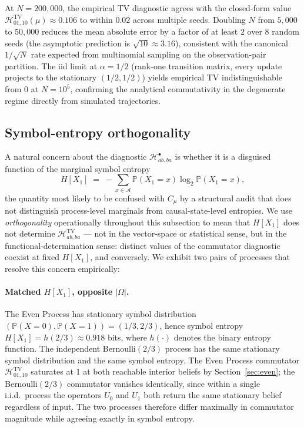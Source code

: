 \documentclass[11pt,a4paper]{article}
\theoremstyle{plain}
\theoremstyle{definition}
\theoremstyle{remark}
\newcommand{\Prob}{\mathbb{P}}
\newcommand{\Alphabet}{\mathcal{A}}
\begin{document}
At $N = 200{,}000$, the empirical TV diagnostic agrees with the closed-form value $\mathcal{H}^{\mathrm{TV}}_{01,10}(\mu) \approx 0.106$ to within $0.02$ across multiple seeds. Doubling $N$ from $5{,}000$ to $50{,}000$ reduces the mean absolute error by a factor of at least $2$ over $8$ random seeds (the asymptotic prediction is $\sqrt{10} \approx 3.16$), consistent with the canonical $1/\sqrt{N}$ rate expected from multinomial sampling on the observation-pair partition. The iid limit at $\alpha = 1/2$ (rank-one transition matrix, every update projects to the stationary $(1/2, 1/2)$) yields empirical TV indistinguishable from $0$ at $N = 10^5$, confirming the analytical commutativity in the degenerate regime directly from simulated trajectories.

\subsection{Symbol-entropy orthogonality}
\label{subsec:orthogonality}

A natural concern about the diagnostic $\mathcal{H}^{\bullet}_{ab,ba}$ is whether it is a disguised function of the marginal symbol entropy
\begin{equation*}
    H[X_1] \;=\; -\sum_{x \in \Alphabet} \Prob(X_1 = x) \log_2 \Prob(X_1 = x),
\end{equation*}
the quantity most likely to be confused with $C_\mu$ by a structural audit that does not distinguish process-level marginals from causal-state-level entropies. We use \emph{orthogonality} operationally throughout this subsection to mean that $H[X_1]$ does not determine $\mathcal{H}^{\mathrm{TV}}_{ab,ba}$ --- not in the vector-space or statistical sense, but in the functional-determination sense: distinct values of the commutator diagnostic coexist at fixed $H[X_1]$, and conversely. We exhibit two pairs of processes that resolve this concern empirically:

\paragraph{Matched $H[X_1]$, opposite $|\Omega|$.} The Even Process has stationary symbol distribution $(\Prob(X = 0), \Prob(X = 1)) = (1/3, 2/3)$, hence symbol entropy $H[X_1] = h(2/3) \approx 0.918$ bits, where $h(\cdot)$ denotes the binary entropy function. The independent Bernoulli$(2/3)$ process has the same stationary symbol distribution and the same symbol entropy. The Even Process commutator $\mathcal{H}^{\mathrm{TV}}_{01,10}$ saturates at $1$ at both reachable interior beliefs by Section~\ref{sec:even}; the Bernoulli$(2/3)$ commutator vanishes identically, since within a single i.i.d.\ process the operators $U_0$ and $U_1$ both return the same stationary belief regardless of input. The two processes therefore differ maximally in commutator magnitude while agreeing exactly in symbol entropy.
\end{document}
